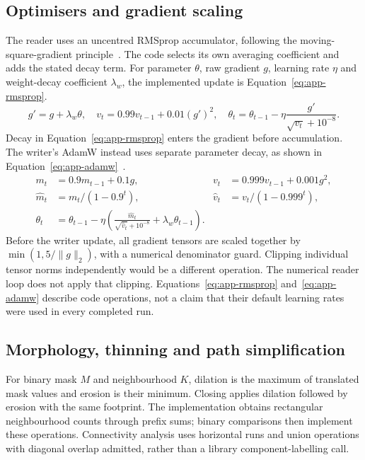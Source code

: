 \subsection{Optimisers and gradient scaling}
The reader uses an uncentred RMSprop accumulator, following the moving-square-gradient principle~\cite[PDF p.~29]{tieleman2012}. The code selects its own averaging coefficient and adds the stated decay term. For parameter $\theta$, raw gradient $g$, learning rate $\eta$ and weight-decay coefficient $\lambda_w$, the implemented update is Equation~\ref{eq:app-rmsprop}.
\begin{equation}
g' =g+\lambda_w\theta,\quad
v_t=0.99v_{t-1}+0.01(g')^2,\quad
\theta_t=\theta_{t-1}-\eta\frac{g'}{\sqrt{v_t}+10^{-8}}.
\label{eq:app-rmsprop}
\end{equation}
Decay in Equation~\ref{eq:app-rmsprop} enters the gradient before accumulation. The writer's AdamW instead uses separate parameter decay, as shown in Equation~\ref{eq:app-adamw}~\cite[p.~2, Alg.~1]{kingma2015}\cite[p.~3, Alg.~2]{loshchilov2019}.
\begin{equation}
\begin{aligned}
m_t&=0.9m_{t-1}+0.1g,& v_t&=0.999v_{t-1}+0.001g^2,\\
\widehat m_t&=m_t/(1-0.9^t),&\widehat v_t&=v_t/(1-0.999^t),\\
\theta_t&=\theta_{t-1}-\eta\left(\frac{\widehat m_t}{\sqrt{\widehat v_t}+10^{-8}}+\lambda_w\theta_{t-1}\right).
\end{aligned}
\label{eq:app-adamw}
\end{equation}
Before the writer update, all gradient tensors are scaled together by $\min(1,5/\|g\|_2)$, with a numerical denominator guard. Clipping individual tensor norms independently would be a different operation. The numerical reader loop does not apply that clipping. Equations~\ref{eq:app-rmsprop} and~\ref{eq:app-adamw} describe code operations, not a claim that their default learning rates were used in every completed run.

\subsection{Morphology, thinning and path simplification}
For binary mask $M$ and neighbourhood $K$, dilation is the maximum of translated mask values and erosion is their minimum. Closing applies dilation followed by erosion with the same footprint. The implementation obtains rectangular neighbourhood counts through prefix sums; binary comparisons then implement these operations. Connectivity analysis uses horizontal runs and union operations with diagonal overlap admitted, rather than a library component-labelling call.

